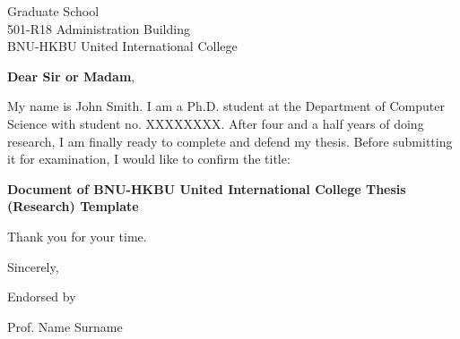 \documentclass[10pt]{letter} %
\begin{document}

\begin{letter}{Graduate School \\ 501-R18 Administration Building \\  BNU-HKBU United International College} %


\opening{\textbf{Dear Sir or Madam},}

My name is John Smith.
I am a Ph.D. student at the Department of Computer Science with student no. XXXXXXXX.
After four and a half years of doing research, I am finally ready to complete and defend my thesis.
Before submitting it for examination, I would like to confirm the title:

\begin{center}
\textbf{Document of BNU-HKBU United International College Thesis (Research) Template}
\end{center}

Thank you for your time.

\vspace{2\parskip} %
\closing{Sincerely,}
\vspace{2\parskip} %

Endorsed by

\vspace{2\parskip} %
\vspace{2\parskip} %

Prof. Name Surname




\end{letter}
 
\end{document}
